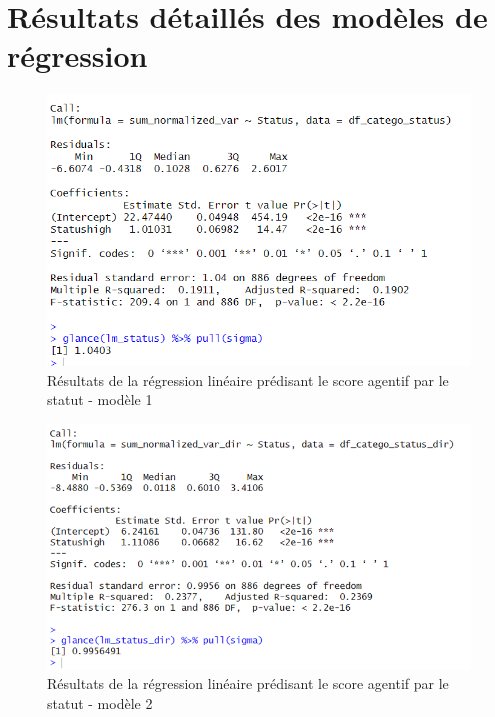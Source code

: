 \newpage
\section{Résultats détaillés des modèles de régression}\label{result_models}

\begin{figure}[!ht]
    \centering
    \includegraphics[width=12cm]{img/lm_statut.png}
    \caption{Résultats de la régression linéaire prédisant le score agentif par le statut - modèle 1}
    \label{lm_statut}
\end{figure}

\begin{figure}[!ht]
    \centering
    \includegraphics[width=12cm]{img/lm_statut_dir.png}
    \caption{Résultats de la régression linéaire prédisant le score agentif par le statut - modèle 2}
    \label{lm_statut_dir}
\end{figure}


